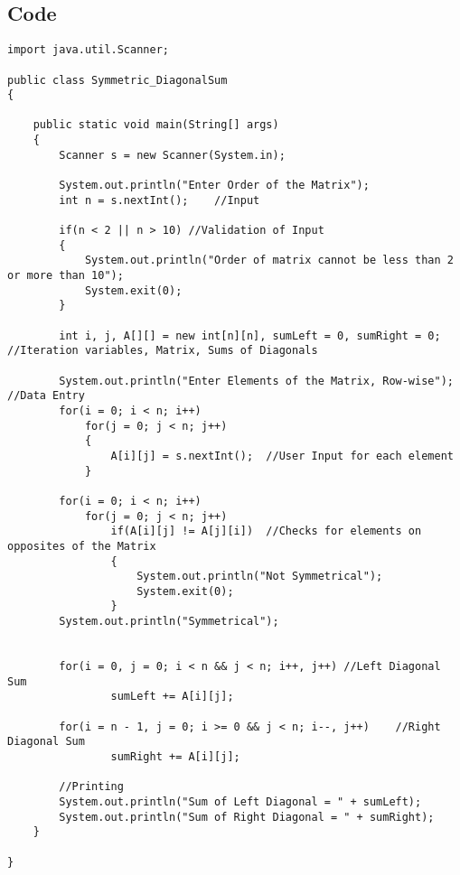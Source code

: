 \documentclass[ProgrammingAssignment.tex]{subfiles}
\begin{document}
\subsection{Code}
\begin{lstlisting}
import java.util.Scanner;

public class Symmetric_DiagonalSum
{

	public static void main(String[] args)
	{
		Scanner s = new Scanner(System.in);
		
		System.out.println("Enter Order of the Matrix");
		int n = s.nextInt();	//Input
		
		if(n < 2 || n > 10)	//Validation of Input
		{
			System.out.println("Order of matrix cannot be less than 2 or more than 10");
			System.exit(0);
		}
		
		int i, j, A[][] = new int[n][n], sumLeft = 0, sumRight = 0;	//Iteration variables, Matrix, Sums of Diagonals
		
		System.out.println("Enter Elements of the Matrix, Row-wise");	//Data Entry
		for(i = 0; i < n; i++)
			for(j = 0; j < n; j++)
			{
				A[i][j] = s.nextInt();	//User Input for each element
			}
		
		for(i = 0; i < n; i++)
			for(j = 0; j < n; j++)
				if(A[i][j] != A[j][i])	//Checks for elements on opposites of the Matrix
				{
					System.out.println("Not Symmetrical");
					System.exit(0);
				}
		System.out.println("Symmetrical");
		
		
		for(i = 0, j = 0; i < n && j < n; i++, j++)	//Left Diagonal Sum
				sumLeft += A[i][j];
		
		for(i = n - 1, j = 0; i >= 0 && j < n; i--, j++)	//Right Diagonal Sum
				sumRight += A[i][j];
		
		//Printing
		System.out.println("Sum of Left Diagonal = " + sumLeft);
		System.out.println("Sum of Right Diagonal = " + sumRight);
	}

}

\end{lstlisting}
\end{document}
